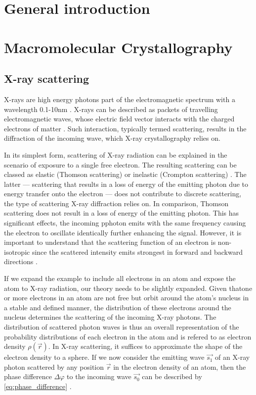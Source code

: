 \section{General introduction}

\section{Macromolecular Crystallography}

\subsection{X-ray scattering}

X-rays are high energy photons part of the electromagnetic spectrum with a wavelength 0.1-10nm \cite{Rupp2010-nc}. X-rays can be described as packets of travelling electromagnetic waves, whose electric field vector interacts with the charged electrons of matter \cite{Rupp2010-nc}. Such interaction, typically termed scattering, results in the diffraction of the incoming wave, which X-ray crystallography relies on.

In its simplest form, scattering of X-ray radiation can be explained in the scenario of exposure to a single free electron. The resulting scattering can be classed as elastic (Thomson scattering) or inelastic (Crompton scattering) \cite{Rupp2010-nc}. The latter --- scattering that results in a loss of energy of the emitting photon due to energy transfer onto the electron --- does not contribute to discrete scattering, the type of scattering X-ray diffraction relies on. In comparison, Thomson scattering does not result in a loss of energy of the emitting photon. This has significant effects, the incoming pphoton emits with the same frequency causing the electron to oscillate identically further enhancing the signal. However, it is important to understand that the scattering function of an electron is non-isotropic since the scattered intensity emits strongest in forward and backward directions \cite{Rupp2010-nc}.

If we expand the example to include all electrons in an atom and expose the atom to X-ray radiation, our theory needs to be slightly expanded. Given thatone or more electrons in an atom are not free but orbit around the atom's nucleus in a stable and defined manner, the distribution of these electrons around the nucleus determines the scattering of the incoming X-ray photons. The distribution of scattered photon waves is thus an overall representation of the probability distributions of each electron in the atom and is refered to as electron density $\rho(\vec{r})$. In X-ray scattering, it suffices to approximate the shape of the electron density to a sphere. If we now consider the emitting wave $\vec{s_1}$ of an X-ray photon scattered by any position $\vec{r}$ in the electron density of an atom, then the phase difference $\Delta\varphi$ to the incoming wave $\vec{s_0}$ can be described by \cref{eq:phase_difference} \cite{Rupp2010-nc}. 

